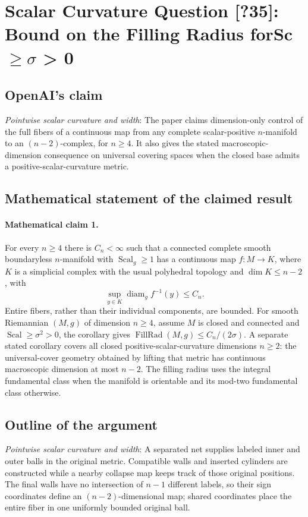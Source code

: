 \documentclass[11pt]{article}
\begin{document}
\section*{Scalar Curvature Question [?35]: Bound on the Filling Radius forSc \(\geq\)\(\sigma\) > 0}

\subsection{OpenAI's claim}
\textit{Pointwise scalar curvature and width}: The paper claims dimension-only control of the full fibers of a continuous map from any complete scalar-positive $n$-manifold to an $(n-2)$-complex, for $n\ge4$. It also gives the stated macroscopic-dimension consequence on universal covering spaces when the closed base admits a positive-scalar-curvature metric.

\subsection{Mathematical statement of the claimed result}
\paragraph{Mathematical claim 1.} For every $n\ge4$ there is $C_n<\infty$ such that a connected complete smooth boundaryless $n$-manifold with $\operatorname{Scal}_g\ge1$ has a continuous map $f:M\to K$, where $K$ is a simplicial complex with the usual polyhedral topology and $\dim K\le n-2$, with \[\sup_{y\in K}\operatorname{diam}_g f^{-1}(y)\le C_n.\] Entire fibers, rather than their individual components, are bounded. For smooth Riemannian $(M,g)$ of dimension $n\ge4$, assume $M$ is closed and connected and $\operatorname{Scal}\ge\sigma^2>0$, the corollary gives $\operatorname{FillRad}(M,g)\le C_n/(2\sigma)$. A separate stated corollary covers all closed positive-scalar-curvature dimensions $n\ge2$: the universal-cover geometry obtained by lifting that metric has continuous macroscopic dimension at most $n-2$. The filling radius uses the integral fundamental class when the manifold is orientable and its mod-two fundamental class otherwise.

\subsection{Outline of the argument}
\textit{Pointwise scalar curvature and width}: A separated net supplies labeled inner and outer balls in the original metric. Compatible walls and inserted cylinders are constructed while a nearby collapse map keeps track of those original positions. The final walls have no intersection of $n-1$ different labels, so their sign coordinates define an $(n-2)$-dimensional map; shared coordinates place the entire fiber in one uniformly bounded original ball.
\end{document}
